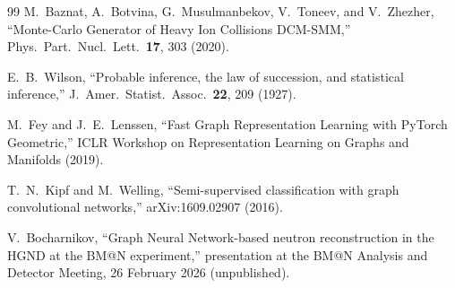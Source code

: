 \documentclass[aps,prc,twocolumn,superscriptaddress,showpacs,%
               nofootinbib,floatfix,longbibliography]{revtex4-2}
\begin{document}
\begin{thebibliography}{99}
  M.~Baznat, A.~Botvina, G.~Musulmanbekov, V.~Toneev, and V.~Zhezher,
  ``Monte-Carlo Generator of Heavy Ion Collisions DCM-SMM,''
  Phys.~Part.~Nucl.~Lett.~\textbf{17}, 303 (2020).

  E.~B.~Wilson,
  ``Probable inference, the law of succession, and statistical inference,''
  J.~Amer.~Statist.~Assoc.~\textbf{22}, 209 (1927).

  M.~Fey and J.~E.~Lenssen,
  ``Fast Graph Representation Learning with PyTorch Geometric,''
  ICLR Workshop on Representation Learning on Graphs and Manifolds (2019).

  T.~N.~Kipf and M.~Welling,
  ``Semi-supervised classification with graph convolutional networks,''
  arXiv:1609.02907 (2016).

  V.~Bocharnikov,
  ``Graph Neural Network-based neutron reconstruction in the HGND at
   the BM@N experiment,''
  presentation at the BM@N Analysis and Detector Meeting,
  26 February 2026 (unpublished).

\end{thebibliography}
\end{document}
